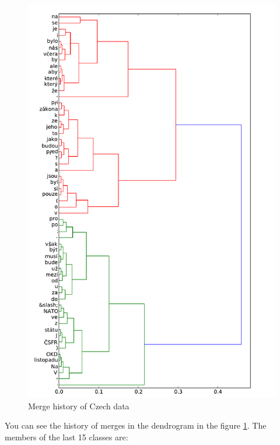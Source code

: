 \documentclass[12pt,a4paper]{article}
\begin{document}
\begin{figure}[h!]
  \centering
  \includegraphics[width=\textwidth]{dendrogram_cs}
  \caption{Merge history of Czech data}
  \label{dendrogram_cs}
\end{figure}

You can see the history of merges in the dendrogram in the figure \ref{dendrogram_cs}.
The members of the last 15 classes are:
\end{document}
